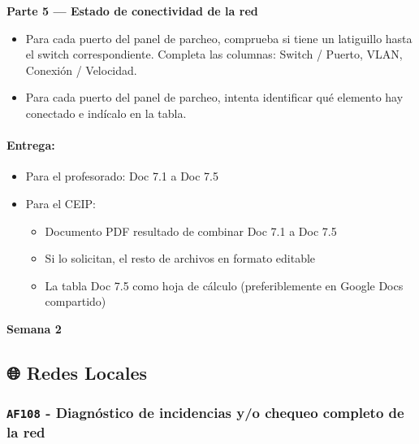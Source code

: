 \documentclass[
  spanish,
  11pt,
  paper=a4,
  ,captions=tableheading
]{scrartcl}
\providecommand{\tightlist}{%
  \setlength{\itemsep}{0pt}\setlength{\parskip}{0pt}}
\begin{document}
\textbf{Parte 5 --- Estado de conectividad de la red}

\begin{itemize}
\tightlist
\item
  Para cada puerto del panel de parcheo, comprueba si tiene un
  latiguillo hasta el switch correspondiente. Completa las columnas:
  Switch / Puerto, VLAN, Conexión / Velocidad.
\item
  Para cada puerto del panel de parcheo, intenta identificar qué
  elemento hay conectado e indícalo en la tabla.
\end{itemize}

\paragraph{Entrega:}\label{entrega}

\begin{itemize}
\tightlist
\item
  Para el profesorado: Doc 7.1 a Doc 7.5
\item
  Para el CEIP:

  \begin{itemize}
  \tightlist
  \item
    Documento PDF resultado de combinar Doc 7.1 a Doc 7.5
  \item
    Si lo solicitan, el resto de archivos en formato editable
  \item
    La tabla Doc 7.5 como hoja de cálculo (preferiblemente en Google
    Docs compartido)
  \end{itemize}
\end{itemize}

\clearpage
\thispagestyle{empty}
\pagecolor{iesprimario}
\vspace*{\fill}
\begin{center}
  {\color{white}\fontsize{72}{86}\selectfont\bfseries Semana 2}
\end{center}
\vspace*{\fill}
\clearpage
\pagecolor{white}

\subsection{🌐 Redes Locales}\label{redes-locales-1}

\subsubsection{\texorpdfstring{\texttt{AF108} - Diagnóstico de
incidencias y/o chequeo completo de la
red}{AF108 - Diagnóstico de incidencias y/o chequeo completo de la red}}\label{af108---diagnuxf3stico-de-incidencias-yo-chequeo-completo-de-la-red}
\end{document}
